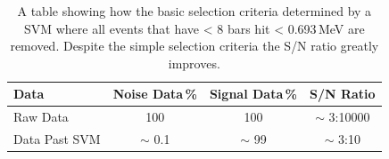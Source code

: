 \begin{table}[!h]
\centering
\begin{tabular}{lccc}  
\toprule
Data          & Noise Data\,\% & Signal Data\,\% & S/N Ratio \\
\midrule
Raw Data      & 100            & 100             & $\sim$ 3:10000\\
Data Past SVM & $\sim$ 0.1     & $\sim$ 99       & $\sim$ 3:10\\
\bottomrule  
\end{tabular}
\caption{A table showing how the basic selection criteria determined by a SVM where all events that have < 8 bars hit < 0.693\,MeV are removed. Despite the simple selection criteria the S/N ratio greatly improves.}
\label{tab:snRatioSvm}
\end{table}

